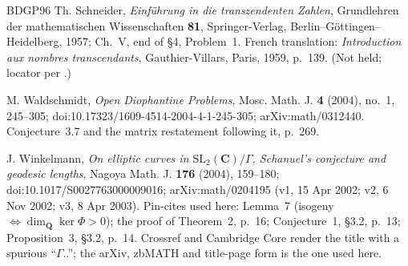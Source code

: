 \documentclass[11pt]{article}
\theoremstyle{definition}
\theoremstyle{remark}
\newcommand{\Q}{\mathbf{Q}}
\newcommand{\C}{\mathbf{C}}
\begin{document}
\begin{thebibliography}{BDGP96}
 Th. Schneider, \emph{Einf\"uhrung in die transzendenten
Zahlen}, Grundlehren der mathematischen Wissenschaften \textbf{81},
Springer-Verlag, Berlin--G\"ottingen--Heidelberg, 1957; Ch.~V, end of \S4,
Problem~1. French translation: \emph{Introduction aux nombres transcendants},
Gauthier-Villars, Paris, 1959, p.~139. (Not held; locator per
\cite[\S3]{Wal04}.)

 M. Waldschmidt, \emph{Open Diophantine Problems},
Mosc. Math. J. \textbf{4} (2004), no.~1, 245--305;
doi:10.17323/1609-4514-2004-4-1-245-305; arXiv:math/0312440. Conjecture~3.7
and the matrix restatement following it, p.~269.

 J. Winkelmann, \emph{On elliptic curves in
$\mathrm{SL}_2(\C)/\Gamma$, Schanuel's conjecture and geodesic lengths},
Nagoya Math. J. \textbf{176} (2004), 159--180;
doi:10.1017/S0027763000009016; arXiv:math/0204195 (v1, 15 Apr 2002; v2,
6 Nov 2002; v3, 8 Apr 2003). Pin-cites used here: Lemma~7 (isogeny
$\Leftrightarrow \dim_\Q \ker \Phi > 0$); the proof of Theorem~2, p.~16;
Conjecture~1, \S3.2, p.~13; Proposition~3, \S3.2, p.~14. Crossref and
Cambridge Core render the title with a spurious ``$\Gamma$..''; the arXiv,
zbMATH and title-page form is the one used here.

\end{thebibliography}
\end{document}
